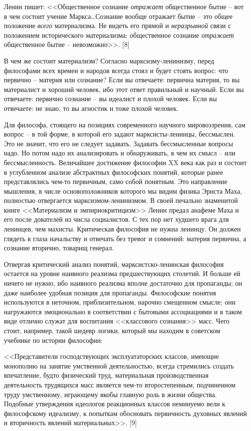 \documentclass{book}
\begin{document}
Ленин пишет: <<Общественное сознание \textit{отражает}  общест­венное бытие -- вот в чем состоит учение Маркса\ldots Сознание 
вообще отражает бытие -- это общее положение \textit{всего}  матери­ализма. Не видеть его прямой и \textit{неразрывной}  связи с 
положе­нием исторического материализма: общественное сознание \textit{отражает}  общественное бытие -- невозможно>>. [8]

В чем же состоит материализм? Согласно марксизму-лени­низму, перед философами всех времен и народов всегда стоял и будет стоять 
вопрос: что первично -- материя или сознание? Если вы отвечаете: первична материя, то вы материалист и хороший человек, ибо этот 
ответ правильный и научный. Если вы отвечаете: первично сознание -- вы идеалист и плохой чело­век. Если вы отвечаете: не знаю, то 
вы агностик и тоже плохой человек.


Для философа, стоящего на позициях современного науч­ного мировоззрения, сам вопрос -- в той форме, в которой его задают 
марксисты-ленинцы, бессмыслен. Это не значит, что его не следует задавать. Задавать бессмысленные вопросы надо. Но потом надо их 
анализировать и обнаруживать, в чем их смысл -- или бессмысленность. Величайшее достижение фило­софии XX века как раз и состоит в 
углубленном анализе абст­рактных философских понятий, которые ранее представлялись чем-то первичным, само собой понятным. Это 
направление мышления, в числе основоположников которого мы видим физика Эрнста Маха, полностью отвергается 
марксизмом-ленинизмом. В своей печально знаменитой книге <<Материализм и эмпириокритицизм>> Ленин предал анафеме Маха и его после­
дователей из числа социалистов. С тех пор нет худшего врага для ленинцев, чем махисты. Критическая философия не нужна ленинцу. 
Он должен глядеть в глаза начальству и отвечать без тревог и сомнений: материя первична, а сознание вторично, товарищ генерал.

Отвергая критический анализ понятий, марксистско-ленинская философия остается на уровне наивного реализма пред­шествующих 
столетий. И больше ей ничего не нужно, ибо наив­ного реализма вполне достаточно для пропаганды; он даже наиболее удобная позиция 
для пропаганды. Философские поня­тия используются в неточном, приблизительном, нарочно сме­щенном смысле; они нагружаются 
эмоционально в соответст­вии с бытовыми ассоциациями и в таком виде отлично служат для воспитания <<классового сознания>> масс. 
Чего стоит, напри­мер, такой шедевр логики, который мы находим в советском учебнике по истории философии:

<<Представители господствующих эксплуататорских классов, имеющие монополию на занятие умственной деятельностью, всегда стремились 
создать впечатление, будто физический труд, материальная производственная деятельность трудящихся масс является чем-то 
второстепенным, подчиненном труду умствен­ному, играющему якобы главную роль в жизни общества. Подобные утверждения идеологов 
реакционных классов неми­нуемо вели к философскому идеализму, к попыткам обосно­вать первичность духовных явлений и вторичность 
явлений ма­териальных>>. [9]
\end{document}
